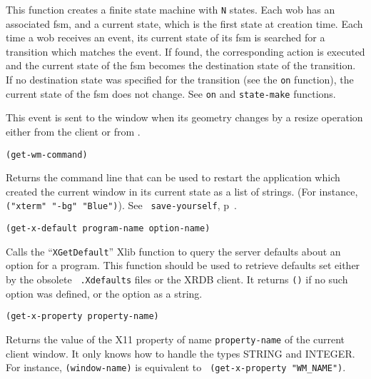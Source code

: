 This function creates a finite state machine with {\tt N} states. Each wob
has an associated fsm, and a current state, which is the first state at
creation time. Each time a wob receives an event, its current state of its
fsm is searched for a transition which matches the event. If found, the
corresponding action is executed and the current state of the fsm becomes
the destination state of the transition. If no destination state was
specified for the transition (see the \verb"on" function), the current state
of the fsm does not change. See \verb"on" and \verb"state-make" functions.

        

This event is sent to the window when its geometry changes by a resize
operation either from the client or from {\GWM}.


{\usagefont\begin{verbatim}
(get-wm-command)
\end{verbatim}}\usageupspace

Returns the command line that can be used to restart the application
which created the current window in its current state as a list of
strings.  (For instance, \verb|("xterm" "-bg" "Blue")|). See {\tt
save-yourself}, p~\pageref{save-yourself}.


{\usagefont\begin{verbatim}
(get-x-default program-name option-name)
\end{verbatim}}\usageupspace

Calls the ``{\tt XGetDefault}'' Xlib function to
query the server defaults about an option for a program. This function
should be used to retrieve defaults set either by the obsolete {\tt
.Xdefaults} files or the XRDB client. It returns \verb"()" if no such
option was defined, or the option as a {\WOOL} string.

        
{\usagefont\begin{verbatim}
(get-x-property property-name)
\end{verbatim}}\usageupspace

Returns the value of the X11 property of name \verb"property-name" of
the current client window. It only knows how to handle the types STRING
and INTEGER\@. For instance, {\tt (window-name)} is equivalent to {\tt
(get-x-property "WM\_NAME")}.

